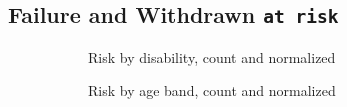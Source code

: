 \documentclass{article}
\begin{document}
\subsection{Failure and Withdrawn \texttt{at risk}}
\begin{figure}[ht!]
	\centering
	\begin{subfigure}{.45\textwidth}
		\centering
		\caption{Risk by disability, count and normalized}
		\label{fig:risk_by_dis_all}
	\end{subfigure}
	\begin{subfigure}{.45\textwidth}
		\centering
		\caption{Risk by age band, count and normalized}
		\label{fig:risk_by_age_all}
	\end{subfigure}
		\begin{subfigure}{.45\textwidth}
		\centering

\end{subfigure}
\end{figure}
\end{document}
